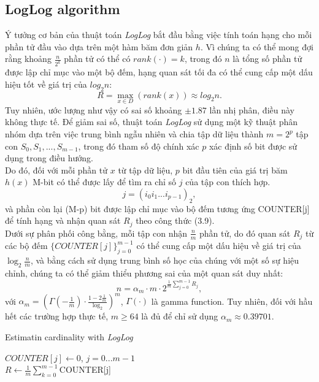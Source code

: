\documentclass[a4paper,13pt]{article}
\theoremstyle{mytheor}
\begin{document}
\subsection*{LogLog algorithm}
Ý tưởng cơ bản của thuật toán \textit{LogLog} bắt đầu bằng việc tính toán hạng cho mỗi phần tử đầu vào dựa trên một hàm băm đơn giản $h$. Vì chúng ta 
có thể mong đợi rằng khoảng $\frac{n}{2^k}$ phần tử có thể có $rank(\cdot) = k$, trong đó $n$ là tổng số phần tử được lập chỉ mục vào một bộ đếm, 
hạng quan sát tối đa có thể cung cấp một dấu hiệu tốt về giá trị của $log_2n$:
\[R = \underset{x \in D}{\max}\left(rank(x)\right) \approx log_2n.\]
Tuy nhiên, ước lượng như vậy có sai số khoảng $\pm1.87$ lần nhị phân, điều này không thực tế. Để giảm sai số, thuật toán \textit{LogLog} sử dụng 
một kỹ thuật phân nhóm dựa trên việc trung bình ngẫu nhiên và chia tập dữ liệu thành $m = 2^p$ tập con $S_0, S_1,..., S_{m-1}$, trong đó tham số 
độ chính xác $p$ xác định số bit được sử dụng trong điều hướng.\\
Do đó, đối với mỗi phần tử $x$ từ tập dữ liệu, $p$ bit đầu tiên của giá trị băm $h(x)$ M-bit có thể được lấy để tìm ra chỉ số $j$ của tập con thích hợp.
\[j = \left(i_0i_1...i_{p-1}\right)_2,\]
và phần còn lại (M-p) bit được lập chỉ mục vào bộ đếm tương ứng COUNTER[j] để tính hạng và nhận quan sát $R_j$ theo công thức (3.9).\\
Dưới sự phân phối công bằng, mỗi tập con nhận $\frac{n}{m}$ phần tử, do đó quan sát $R_j$ từ các bộ đếm $\{COUNTER[j]\}_{j=0}^{m-1}$ có thể cung cấp 
một dấu hiệu về giá trị của $\log_2{\frac{n}{m}}$, và bằng cách sử dụng trung bình số học của chúng với một số sự hiệu chỉnh, chúng ta có thể 
giảm thiểu phương sai của một quan sát duy nhất:
\[
    n = \alpha_m \cdot m \cdot 2 ^{\frac{1}{m}\sum\limits_{j=0}^{m-1}R_j},
\]
với $\alpha_m = \left(\Gamma\left(-\frac{1}{m}\right)\cdot \frac{1-2\frac{1}{m}}{\log_2}\right)^m$, $\Gamma(\cdot)$ là gamma function. 
Tuy nhiên, đối với hầu hết các trường hợp thực tế, $m \geq 64$ là đủ để chỉ sử dụng $\alpha_m \approx 0.39701$.\\

\begin{algorithm}[H]
    \vspace{0.25cm}
    \DontPrintSemicolon
    \LinesNumberedHidden
    \caption[]{Estimatin cardinality with \textit{LogLog}}
    $COUNTER[j] \gets $0, $j = 0...m - 1$\\
    $R \gets \frac{1}{m} \sum\limits_{k=0}^{m-1}$COUNTER[j] \\
    \vspace{0.25cm}
\end{algorithm}
\vspace{0.25cm}
\end{document}
